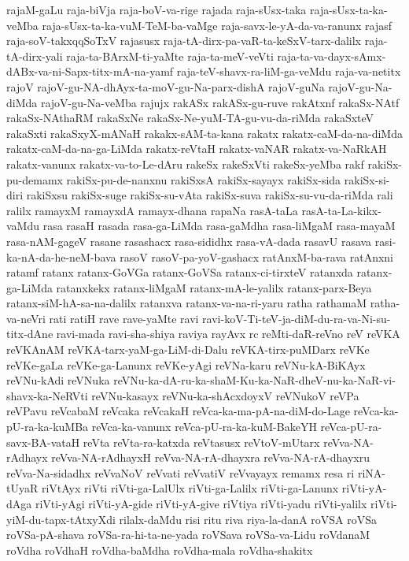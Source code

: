 {rajaM-gaLu
raja-biVja
raja-boV-va-rige
rajada
raja-sUsx-taka
raja-sUsx-ta-ka-veMba
raja-sUsx-ta-ka-vuM-TeM-ba-vaMge
raja-savx-le-yA-da-va-ranunx
rajasf
raja-soV-takxqqSoTxV
rajasusx
raja-tA-dirx-pa-vaR-ta-keSxV-tarx-dalilx
raja-tA-dirx-yali
raja-ta-BArxM-ti-yaMte
raja-ta-meV-veVti
raja-ta-va-dayx-sAmx-dABx-va-ni-Sapx-titx-mA-na-yamf
raja-teV-shavx-ra-liM-ga-veMdu
raja-va-netitx
rajoV
rajoV-gu-NA-dhAyx-ta-moV-gu-Na-parx-dishA
rajoV-guNa
rajoV-gu-Na-diMda
rajoV-gu-Na-veMba
rajujx
rakASx
rakASx-gu-ruve
rakAtxnf
rakaSx-NAtf
rakaSx-NAthaRM
rakaSxNe
rakaSx-Ne-yuM-TA-gu-vu-da-riMda
rakaSxteV
rakaSxti
rakaSxyX-mANaH
rakakx-sAM-ta-kana
rakatx
rakatx-caM-da-na-diMda
rakatx-caM-da-na-ga-LiMda
rakatx-reVtaH
rakatx-vaNAR
rakatx-va-NaRkAH
rakatx-vanunx
rakatx-va-to-Le-dAru
rakeSx
rakeSxVti
rakeSx-yeMba
rakf
rakiSx-pu-demamx
rakiSx-pu-de-nanxnu
rakiSxsA
rakiSx-sayayx
rakiSx-sida
rakiSx-si-diri
rakiSxsu
rakiSx-suge
rakiSx-su-vAta
rakiSx-suva
rakiSx-su-vu-da-riMda
rali
ralilx
ramayxM
ramayxdA
ramayx-dhana
rapaNa
rasA-taLa
rasA-ta-La-kikx-vaMdu
rasa
rasaH
rasada
rasa-ga-LiMda
rasa-gaMdha
rasa-liMgaM
rasa-mayaM
rasa-nAM-gageV
rasane
rasashacx
rasa-sididhx
rasa-vA-dada
rasavU
rasava
rasi-ka-nA-da-he-neM-bava
rasoV
rasoV-pa-yoV-gashacx
ratAnxM-ba-rava
ratAnxni
ratamf
ratanx
ratanx-GoVGa
ratanx-GoVSa
ratanx-ci-tirxteV
ratanxda
ratanx-ga-LiMda
ratanxkekx
ratanx-liMgaM
ratanx-mA-le-yalilx
ratanx-parx-Beya
ratanx-siM-hA-sa-na-dalilx
ratanxva
ratanx-va-na-ri-yaru
ratha
rathamaM
ratha-va-neVri
rati
ratiH
rave
rave-yaMte
ravi
ravi-koV-Ti-teV-ja-diM-du-ra-va-Ni-su-titx-dAne
ravi-mada
ravi-sha-shiya
raviya
rayAvx
rc
reMti-daR-reVno
reV
reVKA
reVKAnAM
reVKA-tarx-yaM-ga-LiM-di-Dalu
reVKA-tirx-puMDarx
reVKe
reVKe-gaLa
reVKe-ga-Lanunx
reVKe-yAgi
reVNa-karu
reVNu-kA-BiKAyx
reVNu-kAdi
reVNuka
reVNu-ka-dA-ru-ka-shaM-Ku-ka-NaR-dheV-nu-ka-NaR-vi-shavx-ka-NeRVti
reVNu-kasayx
reVNu-ka-shAcxdoyxV
reVNukoV
reVPa
reVPavu
reVcabaM
reVcaka
reVcakaH
reVca-ka-ma-pA-na-diM-do-Lage
reVca-ka-pU-ra-ka-kuMBa
reVca-ka-vanunx
reVca-pU-ra-ka-kuM-BakeYH
reVca-pU-ra-savx-BA-vataH
reVta
reVta-ra-katxda
reVtasusx
reVtoV-mUtarx
reVva-NA-rAdhayx
reVva-NA-rAdhayxH
reVva-NA-rA-dhayxra
reVva-NA-rA-dhayxru
reVva-Na-sidadhx
reVvaNoV
reVvati
reVvatiV
reVvayayx
remamx
resa
ri
riNA-tUyaR
riVtAyx
riVti
riVti-ga-LalUlx
riVti-ga-Lalilx
riVti-ga-Lanunx
riVti-yA-dAga
riVti-yAgi
riVti-yA-gide
riVti-yA-give
riVtiya
riVti-yadu
riVti-yalilx
riVti-yiM-du-tapx-tAtxyXdi
rilalx-daMdu
risi
ritu
riva
riya-la-danA
roVSA
roVSa
roVSa-pA-shava
roVSa-ra-hi-ta-ne-yada
roVSava
roVSa-va-Lidu
roVdanaM
roVdha
roVdhaH
roVdha-baMdha
roVdha-mala
roVdha-shakitx
}
